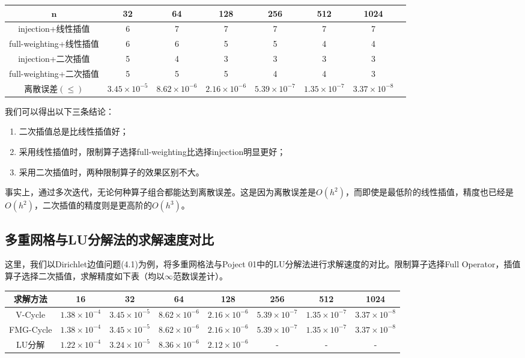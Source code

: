 \documentclass[lang=cn,10pt]{elegantbook}
\begin{document}
\begin{table}[H]
  \centering
  \small
  \begin{tabular}{c|ccccccc}
   $\mathbf{n}$       & 32                   & 64                   & 128                  & 256                  & 512      & 1024           \\ \hline
injection+线性插值   & 6 & 7 & 7 & 7 & 7 &  7 \\
full-weighting+线性插值   & 6 & 6 & 5 & 5 & 4 & 4 \\
injection+二次插值   & 5 & 4 & 3 & 3 & 3 & 3 \\
full-weighting+二次插值   & 5 & 5 & 5 & 4 & 4 & 3 \\
离散误差$(\leq)$   & $3.45\times 10^{-5}$ & $8.62\times 10^{-6}$ & $2.16\times 10^{-6}$ & $5.39\times 10^{-7}$ & $1.35\times 10^{-7}$ & $3.37\times 10^{-8}$
\end{tabular}
\end{table}

我们可以得出以下三条结论：
\begin{enumerate}
  \item 二次插值总是比线性插值好；
  \item 采用线性插值时，限制算子选择full-weighting比选择injection明显更好；
  \item 采用二次插值时，两种限制算子的效果区别不大。
\end{enumerate}

事实上，通过多次迭代，无论何种算子组合都能达到离散误差。这是因为离散误差是$O(h^2)$，而即使是最低阶的线性插值，精度也已经是$O(h^2)$，二次插值的精度则是更高阶的$O(h^3)$。

\subsection{多重网格与LU分解法的求解速度对比}

这里，我们以Dirichlet边值问题(4.1)为例，将多重网格法与Poject 01中的LU分解法进行求解速度的对比。限制算子选择Full Operator，插值算子选择二次插值，求解精度如下表（均以$\infty$范数误差计）。

\begin{table}[H]
  \centering
  \small
  \begin{tabular}{c|ccccccc}
求解方法        & 16                   & 32                   & 64                   & 128                  & 256                  & 512                  & 1024                 \\ \hline
V-Cycle        & $1.38\times 10^{-4}$ & $3.45\times 10^{-5}$ & $8.62\times 10^{-6}$ & $2.16\times 10^{-6}$ & $5.39\times 10^{-7}$ & $1.35\times 10^{-7}$ & $3.37\times 10^{-8}$  \\
FMG-Cycle      & $1.38\times 10^{-4}$ & $3.45\times 10^{-5}$ & $8.62\times 10^{-6}$ & $2.16\times 10^{-6}$ & $5.39\times 10^{-7}$ & $1.35\times 10^{-7}$ & $3.37\times 10^{-8}$  \\
LU分解         & $1.22\times 10^{-4}$ & $3.24\times 10^{-5}$ & $8.36\times 10^{-6}$ & $2.12\times 10^{-6}$ & - & - & - 
\end{tabular}
\end{table}
\end{document}
